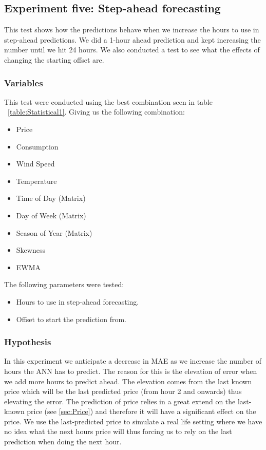 \newpage
\subsection{Experiment five: Step-ahead forecasting}
\label{sec:priceExperimentFive}
This test shows how the predictions behave when we increase the hours to use in step-ahead predictions. We did a 1-hour ahead prediction and kept increasing the number until we hit 24 hours. We also conducted a test to see what the effects of changing the starting offset are.

\subsubsection{Variables}
This test were conducted using the best combination seen in table ~\ref{table:Statistical1}. Giving us the following combination:
\begin{itemize}
	\item Price
	\item Consumption
	\item Wind Speed
	\item Temperature
	\item Time of Day (Matrix)
	\item Day of Week (Matrix)
	\item Season of Year (Matrix)
	\item Skewness
	\item EWMA
\end{itemize}

The following parameters were tested:

\begin{itemize}
	\item Hours to use in step-ahead forecasting.
	\item Offset to start the prediction from.
\end{itemize}

\subsubsection{Hypothesis}
In this experiment we anticipate a decrease in MAE as we increase the number of hours the ANN has to predict. The reason for this is the elevation of error when we add more hours to predict ahead. The elevation comes from the last known price which will be the last predicted price (from hour 2 and onwards) thus elevating the error. The prediction of price relies in a great extend on the last-known price (see \ref{sec:Price}) and therefore it will have a significant effect on the price. We use the last-predicted price to simulate a real life setting where we have no idea what the next hours price will thus forcing us to rely on the last prediction when doing the next hour.


